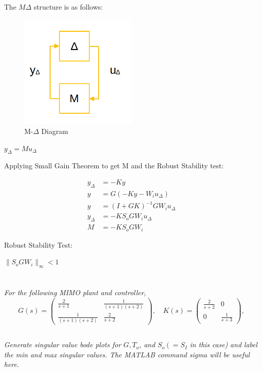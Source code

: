 \documentclass{article}
\begin{document}
The $M \Delta$ structure is as follows:

\begin{figure}[H]
    \centering
    \includegraphics[width=0.5\textwidth]{mDeltaDiagram.png}
    \caption{M-$\Delta$ Diagram}
    \label{fig:mDeltaDiagram2}
\end{figure}

$y_\Delta = Mu_\Delta$

Applying Small Gain Theorem to get M and the Robust Stability test:

\begin{align}
    y_\Delta &=-Ky \\
    y &= G(-Ky-W_i u_\Delta) \\
    y &= (I + GK)^{-1}G W_i u_\Delta \\
    y_\Delta &= -K S_o G W_i u_\Delta \\
    M &= -K S_o G W_i
\end{align}

Robust Stability Test:

$\| S_o G W_i \|_\infty < 1$

\section{}
\textit{For the following MIMO plant and controller,
\[
G(s)=\left(\begin{array}{cc}
\frac{2}{s+1} & \frac{1}{(s+1)(s+2)} \\
\frac{1}{(s+1)(s+2)} & \frac{2}{s+2}
\end{array}\right), \quad K(s)=\left(\begin{array}{cc}
\frac{2}{s+2} & 0 \\
0 & \frac{1}{s+3}
\end{array}\right),
\]}

\subsection{}
\textit{Generate singular value bode plots for $G, T_o$, and $S_o\left(=S_I\right.$ in this case) and label the min and max singular values. The MATLAB command sigma will be useful here.}
\end{document}
